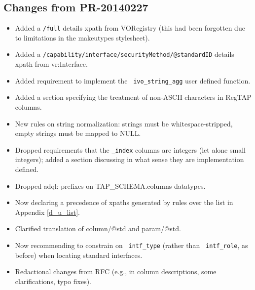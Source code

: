 \documentclass[11pt,a4paper]{ivoa}
\newcommand{\rtent}[1]{\texttt{\color{rtcolor} #1}}
\begin{document}
\subsection{Changes from PR-20140227}

\label{changes-20140227}


\begin{itemize}

\item Added a \texttt{/full} details xpath from VORegistry (this had
  been forgotten due to limitations in the makeutypes stylesheet).{}

\item Added a \texttt{/capability/interface/securityMethod/@standardID}
  details xpath from vr:Interface.{}

\item Added requirement to implement the \rtent{ivo\_string\_agg}
  user defined function.{}

\item Added a section specifying the treatment of non-ASCII characters
  in RegTAP columns.{}

\item New rules on string normalization: strings must be
  whitespace-stripped, empty strings must be mapped to NULL.{}

\item Dropped requirements that the \texttt{\_index} columns are
  integers (let alone small integers); added a section discussing in
  what sense they are implementation defined.{}

\item Dropped adql: prefixes on TAP\_SCHEMA.columns datatypes.{}

\item Now declaring a precedence of xpaths generated by rules over the
  list in Appendix \ref{d_u_list}.{}

\item Clarified translation of column/@std and param/@std.{}

\item Now recommending to constrain on \rtent{intf\_type}
  (rather than \rtent{intf\_role}, as before) when locating standard
  interfaces.{}

\item Redactional changes from RFC (e.g., in column descriptions, some 
  clarifications, typo fixes).{}

\end{itemize}
\end{document}
